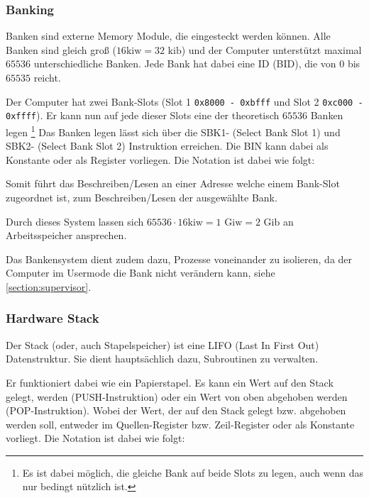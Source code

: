 \documentclass{scrartcl}
\begin{document}
\subsubsection{\label{section:banking}Banking}


Banken sind externe Memory Module, die eingesteckt werden können.
Alle Banken sind gleich groß ($16\text{kiw} = 32\text{ kib}$) und der Computer unterstützt maximal $65536$ unterschiedliche Banken.
Jede Bank hat dabei eine ID (BID), die von $0$ bis $65535$ reicht.

Der Computer hat zwei Bank-Slots (Slot 1 \texttt{0x8000 - 0xbfff} und Slot 2 \texttt{0xc000 - 0xffff}).
Er kann nun auf jede dieser Slots eine der theoretisch $65536$ Banken legen
\footnote{Es ist dabei möglich, die gleiche Bank auf beide Slots zu legen, auch wenn das nur bedingt nützlich ist.}
Das Banken legen lässt sich über die SBK1- (Select Bank Slot 1) und SBK2- (Select Bank Slot 2) Instruktion erreichen.
Die BIN kann dabei als Konstante oder als Register vorliegen. Die Notation ist dabei wie folgt:


Somit führt das Beschreiben/Lesen an einer Adresse welche einem Bank-Slot zugeordnet ist, zum Beschreiben/Lesen der ausgewählte Bank.

Durch dieses System lassen sich $65536 \cdot 16\text{kiw} = 1\text{ Giw} = 2\text{ Gib}$ an Arbeitsspeicher ansprechen.

Das Bankensystem dient zudem dazu, Prozesse voneinander zu isolieren, da der Computer im Usermode die Bank nicht verändern kann, siehe \autoref{section:supervisor}.

\subsubsection{\label{section:stack}Hardware Stack}

Der Stack (oder, auch Stapelspeicher) ist eine LIFO (Last In First Out) Datenstruktur.
Sie dient hauptsächlich dazu, Subroutinen zu verwalten.

Er funktioniert dabei wie ein Papierstapel.
Es kann ein Wert auf den Stack gelegt, werden (PUSH-Instruktion) oder ein Wert von oben abgehoben werden (POP-Instruktion).
Wobei der Wert, der auf den Stack gelegt bzw. abgehoben werden soll, entweder im Quellen-Register bzw. Zeil-Register oder als Konstante vorliegt.
Die Notation ist dabei wie folgt:

\end{document}
